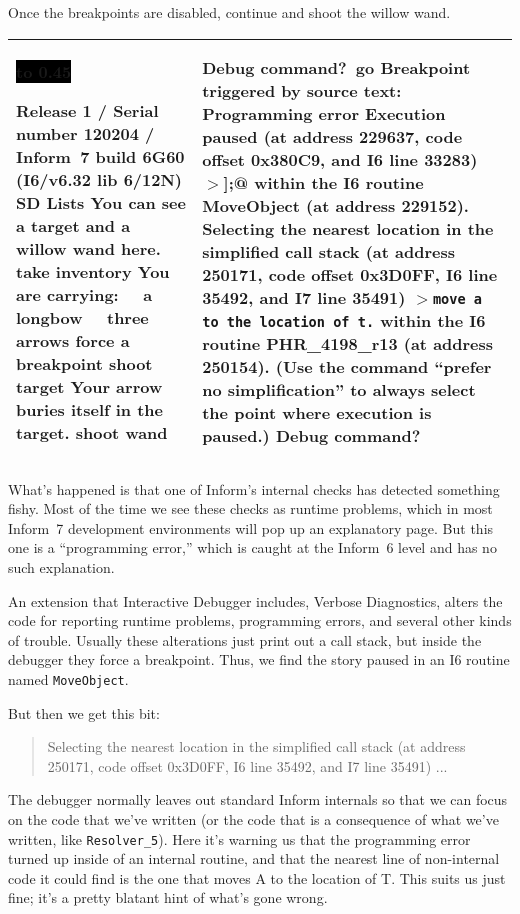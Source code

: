 \documentclass{book}
\newcommand{\n}{\hspace*{\fill}\newline}
\newcommand{\terp}[2]{\begin{center}\begin{tabular}{p{0.45\textwidth}|p{0.45\textwidth}}\midrule #1&#2\\\midrule\end{tabular}\end{center}}
\newcommand{\glkheading}[1]{\textbf{#1}}
\newcommand{\glkinput}[1]{\textbf{#1}}
\newcommand{\glkstatusline}[2]{\centerline{\colorbox{black}{\hbox to 0.45\textwidth{\textcolor{white}{#1\hfil #2}}}}}
\newcommand{\storyprompt}{\raisebox{1.5pt}{\(>\)}}
\newcommand{\cursor}{\raisebox{-1.5pt}{\RectangleThin}}
\newcommand{\markedindent}{\(>\)\qquad}
\begin{document}
Once the breakpoints are disabled, continue and shoot the willow wand.

\terp{\glkstatusline{Lists}{0/3}\n
  Release 1 / Serial number 120204 / Inform~7 build 6G60 (I6/v6.32 lib 6/12N) SD\n
  \n
  \glkheading{Lists}\n
  You can see a target and a willow wand here.\n
  \n
  \storyprompt\glkinput{take inventory}\n
  You are carrying:\n
  \null\ \ a longbow\n
  \null\ \ three arrows\n
  \n
  \storyprompt\glkinput{force a breakpoint}\n
  \storyprompt\glkinput{shoot target}\n
  Your arrow buries itself in the target.\n
  \n
  \storyprompt\glkinput{shoot wand}\n
  \n
  [** Programming error: tried to ``move'' arrow to nothing **]}{%
  Debug command?\ \glkinput{go}\n
  \n
  \glkheading{Breakpoint triggered by source text:} Programming error\n
  \n
  Execution paused (at address 229637, code offset 0x380C9, and I6 line 33283)\n
  \markedindent \lstinline@];@\n
  within the I6 routine MoveObject (at address 229152).\n
  \n
  Selecting the nearest location in the simplified call stack (at address 250171, code offset 0x3D0FF, I6 line 35492, and I7 line 35491)\n
  \markedindent \lstinline {move a to the location of t.}\n
  within the I6 routine PHR\_4198\_r13 (at address 250154).\n
  (Use the command ``prefer no simplification'' to always select the point where execution is paused.)\n
  \n
  Debug command?\ \cursor}

What's happened is that one of Inform's internal checks has detected something
fishy.  Most of the time we see these checks as runtime problems, which in most
Inform~7 development environments will pop up an explanatory page.  But this one
is a ``programming error,'' which is caught at the Inform~6 level and has no
such explanation.

An extension that Interactive Debugger includes, Verbose Diagnostics, alters the
code for reporting runtime problems, programming errors, and several other kinds
of trouble.  Usually these alterations just print out a call stack, but inside
the debugger they force a breakpoint.  Thus, we find the story paused in an I6
routine named \lstinline{MoveObject}.

But then we get this bit:

\begin{quote}
  Selecting the nearest location in the simplified call stack (at address 250171, code offset 0x3D0FF, I6 line 35492, and I7 line 35491) ...
\end{quote}

The debugger normally leaves out standard Inform internals so that we can focus
on the code that we've written (or the code that is a consequence of what we've
written, like \lstinline{Resolver_5}).  Here it's warning us that the
programming error turned up inside of an internal routine, and that the nearest
line of non-internal code it could find is the one that moves A to the location
of T.  This suits us just fine; it's a pretty blatant hint of what's gone wrong.
\end{document}
